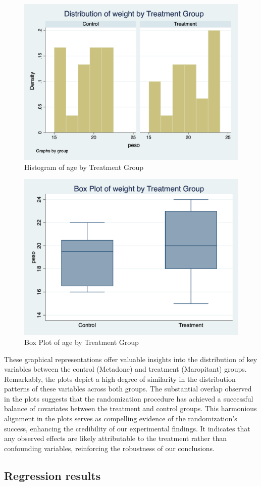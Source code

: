 \documentclass{article}
\begin{document}
\begin{figure}[h]
\centering
\includegraphics[scale=0.30]{histogram_peso_ntrad.png}
\caption{Histogram of age by Treatment Group}
\end{figure}

\begin{figure}[h]
\centering
\includegraphics[scale=0.30]{box_plot_peso_ntrad.png}
\caption{Box Plot of age by Treatment Group}
\end{figure}
These graphical representations offer valuable insights into the distribution of key variables between the control
(Metadone) and treatment (Maropitant) groups. Remarkably, the plots depict a high degree of similarity in the
distribution patterns of these variables across both groups. The substantial overlap observed in the plots suggests that
the randomization procedure has achieved a successful balance of covariates between the treatment and control groups.
This harmonious alignment in the plots serves as compelling evidence of the randomization's success, enhancing the
credibility of our experimental findings. It indicates that any observed effects are likely attributable to the
treatment rather than confounding variables, reinforcing the robustness of our conclusions. 

\subsection{Regression results}
\begin{table}










\end{table}
\end{document}
